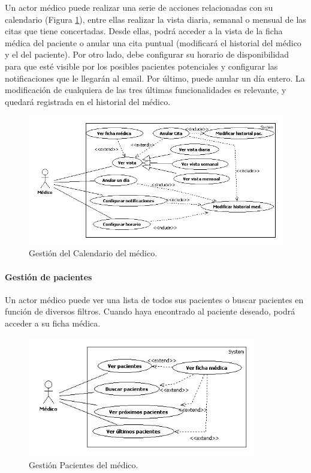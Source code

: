 \documentclass[a4paper,oneside,11pt]{book}
\begin{document}
				Un actor médico puede realizar una serie de acciones relacionadas con su calendario (Figura \ref{fig:cal_med}), entre ellas realizar la vista diaria, semanal o mensual de las citas que tiene concertadas. Desde ellas, podrá acceder a la vista de la ficha médica del paciente o anular una cita puntual (modificará el historial del médico y el del paciente). Por otro lado, debe configurar su horario de disponibilidad para que esté visible por los posibles pacientes potenciales y configurar las notificaciones que le llegarán al email. Por último, puede anular un día entero. La modificación de cualquiera de las tres últimas funcionalidades es relevante, y quedará registrada en el historial del médico.
				\begin{figure}[H]
				  \centering
				    \includegraphics[width=14cm]{img/jpg/casos_uso/Gestion_calendario.jpg}
				  \caption{Gestión del Calendario del médico.}
				  \label{fig:cal_med}
				\end{figure}
		
			\paragraph{Gestión de pacientes} %
			\label{par:gestion_de_pacientes}
				Un actor médico puede ver una lista de todos sus pacientes o buscar pacientes en función de diversos filtros. Cuando haya encontrado al paciente deseado, podrá acceder a su ficha médica.
				\begin{figure}[H]
				  \centering
				    \includegraphics[width=10cm]{img/jpg/casos_uso/Gestion_Pacientes.jpg}
				  \caption{Gestión Pacientes del médico.}
				  \label{fig:pac_med}
				\end{figure}
		
\end{document}
